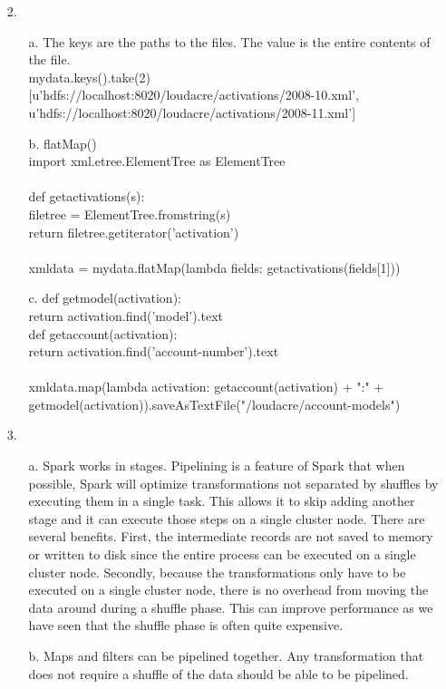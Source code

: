 \documentclass{article}
\begin{document}
\begin{itemize}
\pagebreak
\setlength{\headsep}{5pt}
\item[2.]
	\begin{itemize}
		\item[a.] The keys are the paths to the files. The value is the entire contents of the file.\\
				mydata.keys().take(2)\\
				{[u'hdfs://localhost:8020/loudacre/activations/2008-10.xml',\\
 				u'hdfs://localhost:8020/loudacre/activations/2008-11.xml']}
		\item[b.] flatMap()\\
				import xml.etree.ElementTree as ElementTree\\
				\\
				def getactivations(s):\\
    				filetree = ElementTree.fromstring(s)\\
    				return filetree.getiterator('activation')\\
				\\
				xmldata = mydata.flatMap(lambda fields: getactivations(fields[1]))\\
		\item[c.]
				def getmodel(activation):\\
 					return activation.find('model').text\\
				def getaccount(activation):\\
      				return activation.find('account-number').text\\
      				\\
				xmldata.map(lambda activation: getaccount(activation) + ":" + getmodel(activation)).saveAsTextFile("/loudacre/account-models")

	\end{itemize}
	
\pagebreak
\vspace{2cm}
\item[3.]
	\begin{itemize}
		\item[a.] Spark works in stages. Pipelining is a feature of Spark that when possible, Spark will optimize transformations not separated by shuffles by executing them in a single task. This allows it to skip adding another stage and it can execute those steps on a single cluster node. There are several benefits. First, the intermediate records are not saved to memory or written to disk since the entire process can be executed on a single cluster node. Secondly, because the transformations only have to be executed on a single cluster node, there is no overhead from moving the data around during a shuffle phase. This can improve performance as we have seen that the shuffle phase is often quite expensive.
		\item[b.] Maps and filters can be pipelined together. Any transformation that does not require a shuffle of the data should be able to be pipelined.
	\end{itemize}

\end{itemize}
\end{document}
